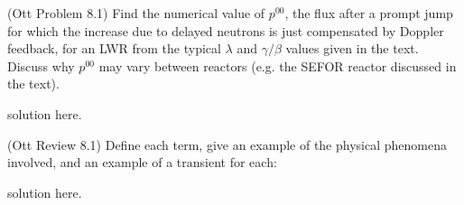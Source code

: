 \documentclass[11pt,addpoints]{exam}
\begin{document}
\begin{questions}

        
        \question[30] (Ott Problem 8.1) Find the numerical value of $p^{00}$, 
        the flux after a prompt jump for which the increase due to delayed 
        neutrons is just compensated by Doppler feedback, for an LWR from the 
        typical $\lambda$ and $\gamma/\beta$ values given in the text. Discuss 
        why $p^{00}$ may vary between reactors (e.g. the SEFOR reactor 
        discussed in the text).

        \begin{solution}
                solution here.
        \end{solution}

        \question[15] (Ott Review 8.1) Define each term, give an example of the 
        physical phenomena involved, and an example of a transient for each: 
        \begin{solution}
                solution here.
        \end{solution}
       
       
\end{questions}



%
%
\end{document}
